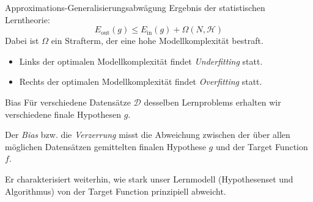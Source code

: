 \begin{bonus}{Approximations-Generalisierungsabwägung}
    Ergebnis der statistischen Lerntheorie:
    \[
        E_\text{out}(g) \leq E_\text{in}(g) + \Omega (N, \mathcal{H})
    \]
    Dabei ist $\Omega$ ein Strafterm, der eine hohe Modellkomplexität bestraft.

    \begin{center}
    \end{center}

    \begin{itemize}
        \item Links der optimalen Modellkomplexität findet \emph{Underfitting} statt.
        \item Rechts der optimalen Modellkomplexität findet \emph{Overfitting} statt.
    \end{itemize}
\end{bonus}

\begin{defi}{Bias}
    Für verschiedene Datensätze $\mathcal{D}$ desselben Lernproblems erhalten wir verschiedene finale Hypothesen $g$.

    Der \emph{Bias} bzw. die \emph{Verzerrung} misst die Abweichung zwischen der über allen möglichen Datensätzen gemittelten finalen Hypothese $g$ und der Target Function $f$.

    Er charakterisiert weiterhin, wie stark unser Lernmodell (Hypothesenset und Algorithmus) von der Target Function prinzipiell abweicht.
\end{defi}

